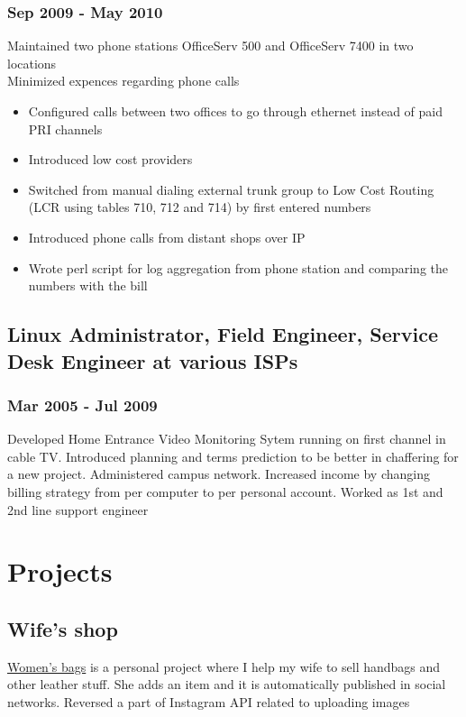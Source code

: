 \documentclass[letterpaper]{article}
\begin{document}
\subsubsection{Sep 2009 - May 2010}
\label{sec-2-4-1}
Maintained two phone stations OfficeServ 500 and OfficeServ 7400 in two locations\\
Minimized expences regarding phone calls
\begin{itemize}
\item Configured calls between two offices to go through ethernet instead of paid PRI channels
\item Introduced low cost providers
\item Switched from manual dialing external trunk group to Low Cost Routing (LCR using tables 710, 712 and 714) by first entered numbers
\item Introduced phone calls from distant shops over IP
\item Wrote perl script for log aggregation from phone station and comparing the numbers with the bill
\end{itemize}
\subsection{Linux Administrator, Field Engineer, Service Desk Engineer at various ISPs}
\label{sec-2-5}
\subsubsection{Mar 2005 - Jul 2009}
\label{sec-2-5-1}
Developed Home Entrance Video Monitoring Sytem running on first channel in cable TV.
Introduced planning and terms prediction to be better in chaffering for a new project. Administered campus network. Increased income by changing billing strategy from per computer to per personal account.
Worked as 1st and 2nd line support engineer

\section{Projects}
\label{sec-3}

\subsection{Wife's shop}
\label{sec-3-1}
\href{https://bars.kh.ua}{Women's bags} is a personal project where I help my wife to sell handbags and other leather stuff. She adds an item and it is automatically published in social networks. Reversed a part of Instagram API related to uploading images
\end{document}
